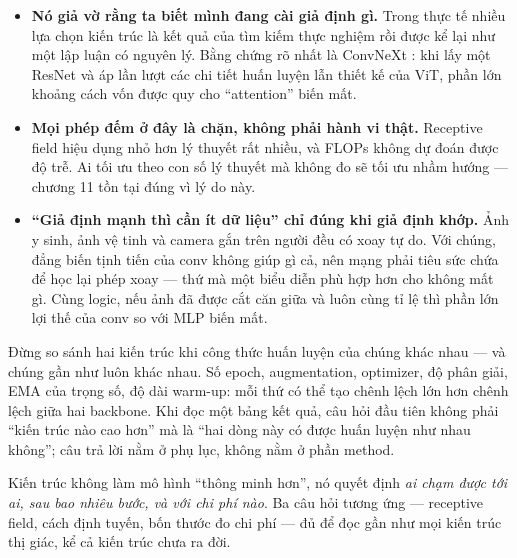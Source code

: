 \documentclass[../../deep_learning.tex]{subfiles}
\begin{document}
\begin{itemize}
\item \textbf{Nó giả vờ rằng ta biết mình đang cài giả định gì.} Trong thực tế nhiều lựa chọn kiến trúc là kết quả của tìm kiếm thực nghiệm rồi được kể lại như một lập luận có nguyên lý. Bằng chứng rõ nhất là ConvNeXt \cite{liu2022convnext}: khi lấy một ResNet và áp lần lượt các chi tiết huấn luyện lẫn thiết kế của ViT, phần lớn khoảng cách vốn được quy cho ``attention'' biến mất.
\item \textbf{Mọi phép đếm ở đây là chặn, không phải hành vi thật.} Receptive field hiệu dụng nhỏ hơn lý thuyết rất nhiều, và FLOPs không dự đoán được độ trễ. Ai tối ưu theo con số lý thuyết mà không đo sẽ tối ưu nhầm hướng --- chương 11 tồn tại đúng vì lý do này.
\item \textbf{``Giả định mạnh thì cần ít dữ liệu'' chỉ đúng khi giả định khớp.} Ảnh y sinh, ảnh vệ tinh và camera gắn trên người đều có xoay tự do. Với chúng, đẳng biến tịnh tiến của conv không giúp gì cả, nên mạng phải tiêu sức chứa để học lại phép xoay --- thứ mà một biểu diễn phù hợp hơn cho không mất gì. Cùng logic, nếu ảnh đã được cắt căn giữa và luôn cùng tỉ lệ thì phần lớn lợi thế của conv so với MLP biến mất.
\end{itemize}

\begin{cambay}
Đừng so sánh hai kiến trúc khi công thức huấn luyện của chúng khác nhau --- và chúng gần như luôn khác nhau. Số epoch, augmentation, optimizer, độ phân giải, EMA của trọng số, độ dài warm-up: mỗi thứ có thể tạo chênh lệch lớn hơn chênh lệch giữa hai backbone. Khi đọc một bảng kết quả, câu hỏi đầu tiên không phải ``kiến trúc nào cao hơn'' mà là ``hai dòng này có được huấn luyện như nhau không''; câu trả lời nằm ở phụ lục, không nằm ở phần method.
\end{cambay}

\begin{cannho}
Kiến trúc không làm mô hình ``thông minh hơn'', nó quyết định \emph{ai chạm được tới ai, sau bao nhiêu bước, và với chi phí nào}. Ba câu hỏi tương ứng --- receptive field, cách định tuyến, bốn thước đo chi phí --- đủ để đọc gần như mọi kiến trúc thị giác, kể cả kiến trúc chưa ra đời. 
\end{cannho}
\end{document}
